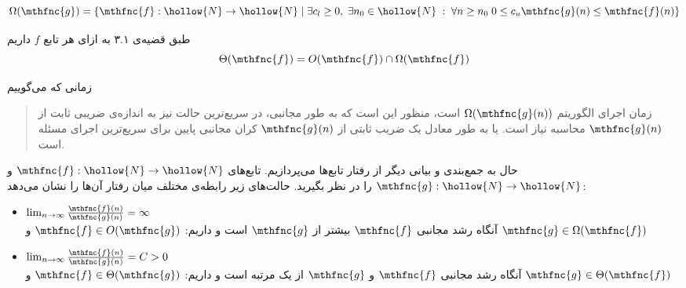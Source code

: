 \[
\Omega( \mthfnc{g} ) = \left\lbrace \mthfnc{f}: \hollow{N} \rightarrow \hollow{N} \;\vert\; \exists c_l \geq 0, \; \exists n_0 \in \hollow{N} \; : \; \forall n \geq n_0 \; 0 \leq c_u \mthfnc{g}(n) \leq \mthfnc{f}(n) \right\rbrace
\]

طبق قضیه‌ی ۳.۱
\cite{clrs2009}
به ازای هر تابع
$f$
داریم
\[
\Theta( \mthfnc{f} ) = O( \mthfnc{f} ) \cap \Omega( \mthfnc{f} )
\]


زمانی که می‌گوییم
\begin{quote}
زمان اجرای الگوریتم
$\Omega( \mthfnc{g}(n) )$
است، منظور این است که به طور مجانبی، در سریع‌ترین حالت نیز به اندازه‌ی ضریبی ثابت از
$\mthfnc{g}(n)$
محاسبه نیاز است. یا به طور معادل یک ضریب ثابتی از
$\mthfnc{g}(n)$
کران مجانبی پایین برای سریع‌ترین اجرای مسئله است.
\end{quote}


حال به جمع‌بندی و بیانی دیگر از رفتار تابع‌ها می‌پردازیم. تابع‌های
$\mthfnc{f} : \hollow{N} \rightarrow \hollow{N}$
و
$\mthfnc{g} : \hollow{N} \rightarrow \hollow{N}$
را در نظر بگیرید. حالت‌های زیر رابطه‌ی مختلف میان رفتار آن‌ها را نشان می‌دهد:
\begin{itemize}
\item $\lim_{n\rightarrow \infty} \frac{ \mthfnc{f}(n) }{ \mthfnc{g}(n) } = \infty$\\
آنگاه رشد مجانبی
$\mthfnc{f}$
بیشتر از
$\mthfnc{g}$
است و داریم:
$\mthfnc{f} \in O( \mthfnc{g} )$
و
$\mthfnc{g} \in \Omega ( \mthfnc{f} ) $

\item $\lim_{n\rightarrow \infty} \frac{ \mthfnc{f}(n) }{ \mthfnc{g}(n) } = C > 0$\\
آنگاه رشد مجانبی
$\mthfnc{f}$
و
$\mthfnc{g}$
از یک مرتبه است و داریم:
$\mthfnc{f} \in \Theta( \mthfnc{g} )$
و
$\mthfnc{g} \in \Theta( \mthfnc{f} )$


\end{itemize}